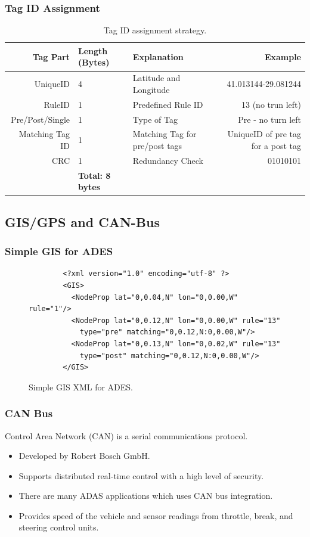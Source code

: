 \documentclass{beamer}
\newenvironment{mylisting}
{\begin{list}{}{\setlength{\leftmargin}{1em}}\item\scriptsize\bfseries}
{\end{list}}
\begin{document}
\frame
{
  \frametitle{Tag ID Assignment}
	\begin{table}%
	\caption{Tag ID assignment strategy.}
	{\tiny
	\begin{tabular}{|r|p{10mm}|p{30mm}|r|}
	\hline
	{\bf Tag Part} & {\bf Length (Bytes)} & {\bf Explanation} & {\bf Example} \\
	\hline
	  UniqueID &          4 & Latitude and Longitude & 41.013144-29.081244 \\
	\hline
	    RuleID &          1 & Predefined Rule ID & 13 (no trun left) \\
	\hline
	Pre/Post/Single &          1 & Type of Tag & Pre - no turn left \\
	\hline
	Matching Tag ID &          1 & Matching Tag for pre/post tags  & UniqueID of pre tag for a post tag \\
	\hline
	       CRC &          1 & Redundancy Check &   01010101 \\
	\hline
	           & {\bf Total: 8 bytes} &            &            \\
	\hline
	\end{tabular} 
	}
	\label{tagid}
	\end{table}
}

\subsection{GIS/GPS and CAN-Bus}
\begin{frame}[fragile]
	\frametitle{Simple GIS for ADES}
	\begin{figure}[!ht]
  \centering
	\begin{mylisting}
	\begin{verbatim}
		<?xml version="1.0" encoding="utf-8" ?>
		<GIS>
		  <NodeProp lat="0,0.04,N" lon="0,0.00,W" rule="1"/>
		  <NodeProp lat="0,0.12,N" lon="0,0.00,W" rule="13" 
		    type="pre" matching="0,0.12,N:0,0.00,W"/>
		  <NodeProp lat="0,0.13,N" lon="0,0.02,W" rule="13" 
		    type="post" matching="0,0.12,N:0,0.00,W"/>
		</GIS>
	\end{verbatim}
	\end{mylisting}
	\caption{Simple GIS XML for ADES.}
	\label{gisxml}
	\end{figure}
\end{frame}

\frame
{
	\frametitle{CAN Bus}
	Control Area Network (CAN) is a serial communications protocol. 
	\begin{itemize}
	\item Developed by Robert Bosch GmbH. 
	\item Supports distributed real-time control with a high level of security. 
	\item There are many ADAS applications which uses CAN bus integration.
	\item Provides speed of the vehicle and sensor readings from throttle, break, and steering control units.
	\end{itemize}
}
\end{document}
